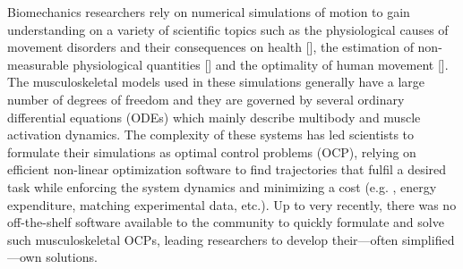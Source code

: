 Biomechanics researchers rely on numerical simulations of motion to gain understanding on a variety of scientific topics such as the physiological causes of movement disorders and their consequences on health [\addref], the estimation of non-measurable physiological quantities [\addref] and the optimality of human movement [\addref].
The musculoskeletal models used in these simulations generally have a large number of degrees of freedom and they are governed by several ordinary differential equations (ODEs) which mainly describe multibody and muscle activation dynamics.
The complexity of these systems has led scientists to formulate their simulations as optimal control problems (OCP), relying on efficient non-linear optimization software to find trajectories that fulfil a desired task while enforcing the system dynamics and minimizing a cost (e.g. , energy expenditure, matching experimental data, etc.).
Up to very recently, there was no off-the-shelf software available to the community to quickly formulate and solve such musculoskeletal OCPs, leading researchers to develop their---often simplified---own solutions.

